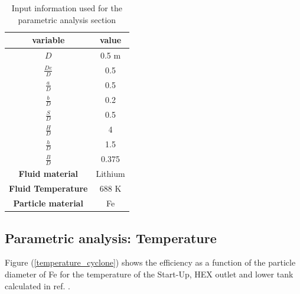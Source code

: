 \begin{table}[H]
	\centering
	\begin{tabular}{cc}
			\rule[-0.3cm]{0pt}{0.8cm} \textbf{variable} & \textbf{value} \\ \hline
			\rule[-0.3cm]{0pt}{0.8cm}\textbf{$D$}                            & 0.5 m          \\ \hline
			\rule[-0.3cm]{0pt}{0.8cm}\textbf{$\frac{De}{D}$}                        & 0.5            \\ \hline
			\rule[-0.3cm]{0pt}{0.8cm}\textbf{$\frac{a}{D}$}                         & 0.5            \\ \hline
			\rule[-0.3cm]{0pt}{0.8cm}\textbf{$\frac{b}{D}$}                         & 0.2            \\ \hline
			\rule[-0.3cm]{0pt}{0.8cm}\textbf{$\frac{S}{D}$}                         & 0.5            \\ \hline
			\rule[-0.3cm]{0pt}{0.8cm}\textbf{$\frac{H}{D}$}                         & 4              \\ \hline
			\rule[-0.3cm]{0pt}{0.8cm}\textbf{$\frac{h}{D}$}                         & 1.5            \\ \hline
			\rule[-0.3cm]{0pt}{0.8cm}\textbf{$\frac{B}{D}$}                         & 0.375          \\ \hline
			\rule[-0.3cm]{0pt}{0.8cm}\textbf{Fluid material}               & Lithium        \\ \hline
			\rule[-0.3cm]{0pt}{0.8cm}\textbf{Fluid Temperature}            & 688 K          \\ \hline
			\rule[-0.3cm]{0pt}{0.8cm}\textbf{Particle material}            & Fe            \\ \hline
	\end{tabular}
	\caption{Input information used for the parametric analysis section}
	\label{input_information}
\end{table}
\subsection{Parametric analysis: Temperature}
Figure (\ref{temperature_cyclone}) shows the efficiency as a function of the particle diameter of Fe for the temperature of the Start-Up, HEX outlet and lower tank calculated in ref. \cite{power_scenario}. 


